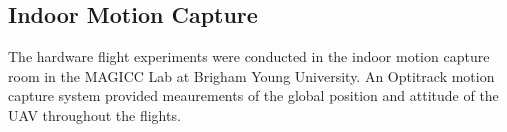 
\subsection{Indoor Motion Capture}
The hardware flight experiments were conducted in the indoor motion capture room
in the MAGICC Lab at Brigham Young University. An Optitrack motion capture
system provided meaurements of the global position and attitude of the UAV
throughout the flights.

